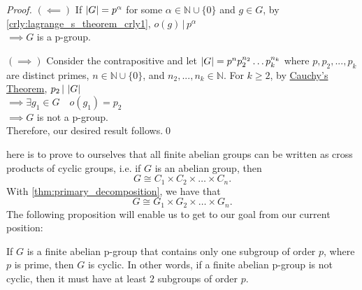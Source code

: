 \begin{proof}
  $(\impliedby)$ If $\left|G\right| = p^\alpha$ for some $\alpha \in \mathbb{N} \cup \{0\}$ and $g \in G$, by \cref{crly:lagrange_s_theorem_crly1}, $o(g) \, | \, p^\alpha$ \\
  $\implies G$ is a p-group.

  \noindent $(\implies)$ Consider the contrapositive and let $\left|G\right| = p^n p_2^{n_2} \hdots p_k^{n_k}$ where $p, p_2, ..., p_k$ are distinct primes, $n \in \mathbb{N} \cup \{0\}$, and $n_2, ..., n_k \in \mathbb{N}$. For $k \geq 2$, by \hyperref[thm:cauchy]{Cauchy's Theorem}, $p_2 \, | \, \left|G\right|$\\
  $\implies \exists g_1 \in G \quad o(g_1) = p_2$\\
  $\implies G$ is not a p-group.\\
  Therefore, our desired result follows.\qed
\end{proof}

 here is to prove to ourselves that all finite abelian groups can be written as cross products of cyclic groups, i.e. if $G$ is an abelian group, then
\begin{equation*}
  G \cong C_1 \times C_2 \times \hdots \times C_n.
\end{equation*}
With \cref{thm:primary_decomposition}, we have that
\begin{equation*}
  G \cong G_1 \times G_2 \times \hdots \times G_n.
\end{equation*}
The following proposition will enable us to get to our goal from our current position:

\begin{propononum}
If $G$ is a finite abelian p-group that contains only one subgroup of order $p$, where $p$ is prime, then $G$ is cyclic. In other words, if a finite abelian p-group is not cyclic, then it must have at least $2$ subgroups of order $p$.
\end{propononum}



